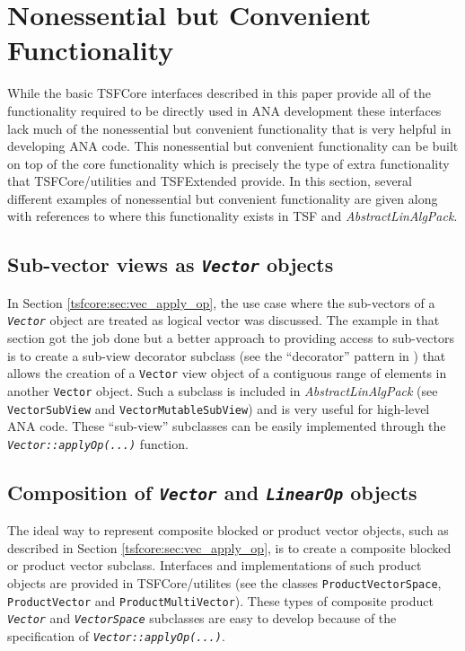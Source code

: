 %
\section{Nonessential but Convenient Functionality}
\label{tsfcore:sec:convenience_functionality}
%

While the basic TSFCore interfaces described in this paper provide all
of the functionality required to be directly used in ANA development
these interfaces lack much of the nonessential but convenient
functionality that is very helpful in developing ANA code.  This
nonessential but convenient functionality can be built on top of the
core functionality which is precisely the type of extra functionality
that TSFCore/utilities and TSFExtended provide.  In this section,
several different examples of nonessential but convenient
functionality are given along with references to where this
functionality exists in TSF and {}\textit{AbstractLinAlgPack}.

%
\subsection{Sub-vector views as {}\texttt{\textit{Vector}} objects}
%

In Section {}\ref{tsfcore:sec:vec_apply_op}, the use case where the
sub-vectors of a {}\texttt{\textit{Vector}} object are treated as
logical vector was discussed.  The example in that section got the job
done but a better approach to providing access to sub-vectors is to
create a sub-view decorator subclass (see the ``decorator'' pattern in
{}\cite{ref:gama_et_al_1995}) that allows the creation of a
{}\texttt{Vector} view object of a contiguous range of elements in
another {}\texttt{Vector} object.  Such a subclass is included in
{}\textit{AbstractLinAlgPack} (see {}\texttt{VectorSubView} and
{}\texttt{Vector\-Mutable\-Sub\-View}) and is very useful for
high-level ANA code.  These ``sub-view'' subclasses can be easily
implemented through the {}\texttt{\textit{Vector\-::applyOp(\-...)}}
function.

%
\subsection{Composition of {}\texttt{\textit{Vector}} and {}\texttt{\textit{LinearOp}} objects}
\label{tsfcore:sec:composite_abstractions}
%

The ideal way to represent composite blocked or product vector
objects, such as described in Section
{}\ref{tsfcore:sec:vec_apply_op}, is to create a composite blocked or
product vector subclass.  Interfaces and implementations of such
product objects are provided in TSFCore/utilites (see the classes
{}\texttt{Product\-Vector\-Space}, {}\texttt{Product\-Vector} and
{}\texttt{Product\-Multi\-Vector}).  These types of composite product
{}\texttt{\textit{Vector}} and {}\texttt{\textit{VectorSpace}}
subclasses are easy to develop because of the specification of
{}\texttt{\textit{Vector\-::applyOp(\-...)}}.

